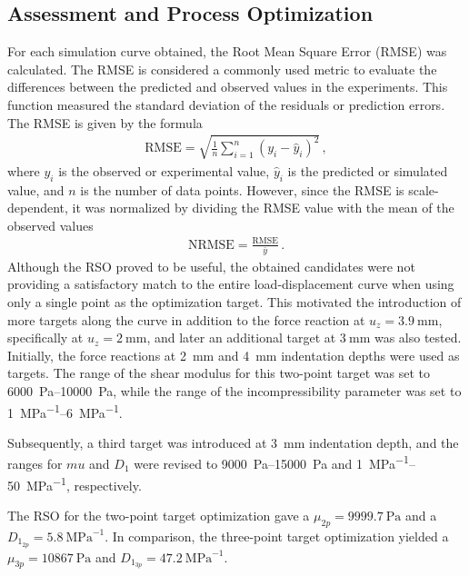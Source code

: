 \subsection*{Assessment and Process Optimization}
For each simulation curve obtained, the Root Mean Square Error (RMSE) was calculated.
The RMSE is considered a commonly used metric to evaluate the differences between the predicted and 
observed values in the experiments. This function measured the standard deviation of the residuals 
or prediction errors. The RMSE is given by the formula 
\begin{align}
	\text{RMSE} = \sqrt{\frac{1}{n}\sum_{i=1}^{n}(y_i - \hat{y}_i)^2}\, ,
    \label{eq:rmse}
\end{align}
where $y_i$ is the observed or experimental value, $\hat{y}_i$ is the predicted or simulated value, and 
$n$ is the number of data points. However, since the RMSE is scale-dependent, it was normalized by dividing the
RMSE value with the mean of the observed values%
\begin{align}
	\text{NRMSE} = \frac{\text{RMSE}}{\bar{y}} \, .
    \label{eq:nrmse}
\end{align}
Although the RSO proved to be useful, the obtained candidates were not providing a satisfactory 
match to the entire load-displacement curve when using only a single point as the optimization target.
This motivated the introduction of more targets along the curve in addition to the force reaction at 
$u_z=\SI{3.9}{\milli\meter}$, specifically at $u_z=\SI{2}{\milli\meter}$, 
and later an additional target at $\SI{3}{\milli\meter}$ was also tested.\\

Initially, the force reactions at \SI{2}{\milli\meter} and \SI{4}{\milli\meter} indentation depths
were used as targets. The range of the shear modulus for this two-point target was set to
\SIrange{6000}{10000}{\pascal}, while the range of the incompressibility parameter was set to 
\SIrange{1}{6}{\mega\pascal\tothe{-1}}.

Subsequently, a third target was introduced at \SI{3}{\milli\meter} indentation depth, and the ranges 
for $mu$ and $D_1$ were revised to \SIrange{9000}{15000}{\pascal} and \SIrange{1}{50}{\mega\pascal\tothe{-1}}, 
respectively.

The RSO for the two-point target optimization gave a $\mu_{2p}=\SI{9999.7}{\pascal}$ and a 
$D_{1_{2p}}=\SI{5.8}{\mega\pascal\tothe{-1}}$. In comparison, the three-point target optimization 
yielded a  $\mu_{3p}=\SI{10867}{\pascal}$ and $D_{1_{3p}}=\SI{47.2}{\mega\pascal\tothe{-1}}$.

